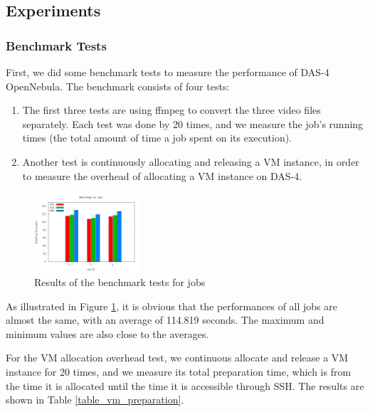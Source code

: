 \subsection{Experiments}

\subsubsection{Benchmark Tests}
First, we did some benchmark tests to measure the performance of DAS-4 OpenNebula. The benchmark consists of four tests:

\begin{enumerate}
\item The first three tests are using ffmpeg to convert the three video files separately. Each test was done by 20 times, and we measure the job's running times (the total amount of time a job spent on its execution).
\item Another test is continuously allocating and releasing a VM instance, in order to measure the overhead of allocating a VM instance on DAS-4.
\end{enumerate}

\begin{figure}[!t]
\centering
\includegraphics[width=0.35\textwidth]{pictures/bench-jobs.png}
\caption{Results of the benchmark tests for jobs}
\label{figure_jobbenchmark}
\end{figure}

As illustrated in Figure \ref{figure_jobbenchmark}, it is obvious that the performances of all jobs are almost the same, with an average of 114.819 seconds. The maximum and minimum values are also close to the averages.

For the VM allocation overhead test, we continuous allocate and release a VM instance for 20 times, and we measure its total preparation time, which is from the time it is allocated until the time it is accessible through SSH. The results are shown in Table \ref{table_vm_preparation}.

